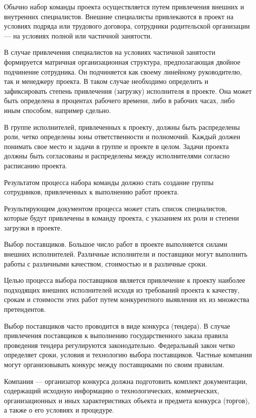Обычно набор команды проекта осуществляется путем привле­чения внешних и внутренних специалистов.
Внешние специалисты привлекаются в проект на условиях подряда или трудового догово­ра, сотрудники родительской организации --- на условиях полной или частичной занятости.

В случае привлечения специалистов на условиях частичной заня­тости формируется матричная организационная структура, предпола­гающая двойное подчинение сотрудника.
Он подчиняется как своему линейному руководителю, так и менеджеру проекта.
В таком случае необходимо определить и зафиксировать степень привлечения (за­грузку) исполнителя в проекте.
Она может быть определена в про­центах рабочего времени, либо в рабочих часах, либо иным способом, например сдельно.

В группе исполнителей, привлеченных к проекту, должны быть распределены роли, четко определены зоны ответственности и пол­номочий.
Каждый должен понимать свое место и задачи в группе и проекте в целом.
Задачи проекта должны быть согласованы и распре­делены между исполнителями согласно расписанию проекта.

Результатом процесса набора команды должно стать создание группы сотрудников, привлеченных к выполнению работ проекта.

Результирующим документом процесса может стать список специа­листов, которые будут привлечены в команду проекта, с указанием их роли и степени загрузки в проекте.

Выбор поставщиков.
Большое число работ в проекте выполняется силами внешних испол­нителей.
Различные исполнители и поставщики могут выполнить ра­боты с различными качеством, стоимостью и в различные сроки.

Целью процесса выбора поставщиков является привлечение к про­екту наиболее подходящих внешних исполнителей исходя из требований проекта к качеству, срокам и стоимости этих работ путем конку­рентного выявления их из множества претендентов.

Выбор поставщиков часто проводится в виде конкурса (тендера).
В случае привлечения поставщиков к выполнению государственного заказа правила проведения тендера регулируются законодательно.
Федеральный закон четко определяет сроки, условия и технологию выбора поставщиков.
Частные компании могут организовывать кон­курс между поставщиками по своим правилам.

Компания --- организатор конкурса должна подготовить комплект документации, содержащий исходную информацию о технологических, коммерческих, организационных и иных характеристиках объекта и предмета конкурса (торгов), а также о его условиях и процедуре.


